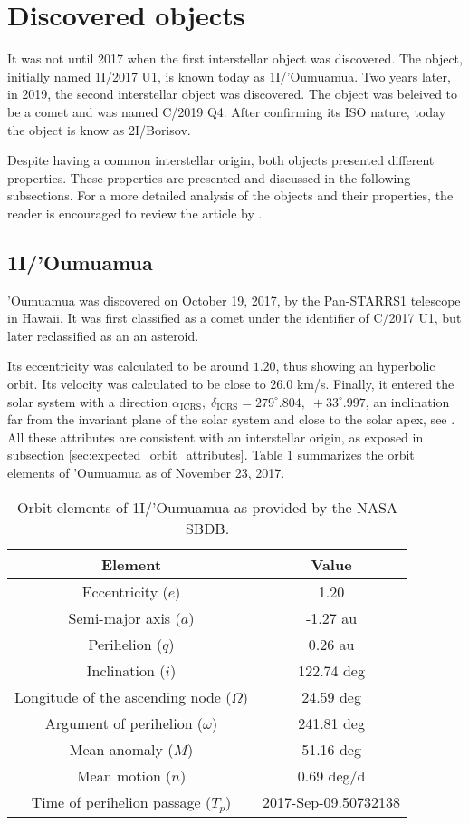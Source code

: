 \section{Discovered objects}

It was not until 2017 when the first interstellar object was discovered. The
object, initially named 1I/2017 U1, is known today as 1I/'Oumuamua. Two years
later, in 2019, the second interstellar object was discovered. The object was
beleived to be a comet and was named C/2019 Q4. After confirming its ISO nature,
today the object is know as 2I/Borisov. 

Despite having a common interstellar origin, both objects presented different
properties. These properties are presented and discussed in the following
subsections. For a more detailed analysis of the objects and their properties,
the reader is encouraged to review the article by \cite{jewitt2023}.

\subsection{1I/'Oumuamua}

'Oumuamua was discovered on October 19, 2017, by the Pan-STARRS1 telescope in
Hawaii. It was first classified as a comet under the identifier of C/2017 U1,
but later reclassified as an an asteroid.

Its eccentricity was calculated to be around $1.20$, thus showing an hyperbolic
orbit. Its velocity was calculated to be close to $26.0$ km/s. Finally, it
entered the solar system with a direction $\alpha_{\text{ICRS}},\;
\delta_{\text{ICRS}} = 279^\circ.804,\; +33^\circ.997$, an inclination far from
the invariant plane of the solar system and close to the solar apex, see
\cite{mamajek2017}. All these attributes are consistent with an interstellar
origin, as exposed in subsection \ref{sec:expected_orbit_attributes}. Table
\ref{tab:oumuamua_elements} summarizes the orbit elements of 'Oumuamua as of
November 23, 2017.

\begin{table}[H]
  \centering
  \begin{tabular}{|c|c|}
    \hline
    Element & Value \\
    \hline
    Eccentricity ($e$) & 1.20 \\
    Semi-major axis ($a$) & -1.27 au \\
    Perihelion ($q$) & 0.26 au \\
    Inclination ($i$) & 122.74 deg \\
    Longitude of the ascending node ($\Omega$) & 24.59 deg \\
    Argument of perihelion ($\omega$) & 241.81 deg \\
    Mean anomaly ($M$) & 51.16 deg \\
    Mean motion ($n$) & 0.69 deg/d \\
    Time of perihelion passage ($T_p$) & 2017-Sep-09.50732138 \\
    \hline
  \end{tabular}
  \caption{Orbit elements of 1I/'Oumuamua as provided by the NASA SBDB.}
  \label{tab:oumuamua_elements}
\end{table}

